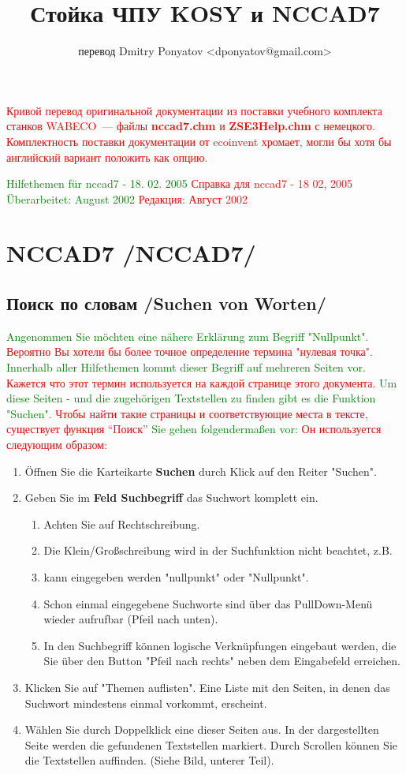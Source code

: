 \documentclass[12pt,a4paper]{book}
\title{Стойка ЧПУ KOSY и NCCAD7}
\author{перевод Dmitry Ponyatov <dponyatov@gmail.com>}
\newcommand{\DE}[1]{\textcolor{green}{#1}}
\newcommand{\RU}[1]{\textcolor{red}{#1}}
\newcommand{\TRpart}[2]{\part{#2 /#1/}}
\newcommand{\TRchapter}[2]{\chapter{#2 /#1/}}
\newcommand{\file}[1]{\textbf{#1}}
\begin{document}
\maketitle

\RU{Кривой перевод оригинальной документации из поставки учебного комплекта станков
WABECO~--- файлы \file{nccad7.chm} и \file{ZSE3Help.chm} с немецкого.
Комплектность поставки документации от ecoinvent хромает, могли бы хотя бы
английский вариант положить как опцию.}

\tableofcontents

\DE{Hilfethemen für nccad7 - 18. 02. 2005}
\RU{Справка для nccad7 - 18 02, 2005}
\DE{Überarbeitet: August 2002}
\RU{Редакция: Август 2002}

\TRpart{NCCAD7}{NCCAD7}

\TRchapter{Suchen von Worten}{Поиск по словам}

\bigskip 

\DE{Angenommen Sie möchten eine nähere Erklärung zum Begriff "Nullpunkt".}
\RU{Вероятно Вы хотели бы более точное определение термина
"нулевая точка".}
\DE{Innerhalb aller Hilfethemen kommt dieser Begriff auf mehreren Seiten vor.}
\RU{Кажется что этот термин используется на каждой странице этого
документа.}
\DE{Um diese Seiten - und die zugehörigen Textstellen zu finden gibt es die
Funktion "Suchen".}
\RU{Чтобы найти такие страницы и соответствующие места в тексте,
существует функция ``Поиск''}
\DE{Sie gehen folgendermaßen vor:}
\RU{Он используется следующим образом:}
\begin{enumerate}
  \item Öffnen Sie die Karteikarte \textbf{Suchen} durch Klick auf den Reiter
  "Suchen".
  \item Geben Sie im \textbf{Feld Suchbegriff} das Suchwort komplett ein. 
\begin{enumerate}
  \item Achten Sie auf Rechtschreibung. 
  \item Die Klein/Großschreibung wird in der Suchfunktion nicht beachtet, z.B.
  \item kann eingegeben werden "nullpunkt" oder "Nullpunkt".
  \item Schon einmal eingegebene Suchworte sind über das PullDown-Menü wieder
  aufrufbar (Pfeil nach unten).
  \item In den Suchbegriff können logische Verknüpfungen eingebaut werden, die
Sie über den Button "Pfeil nach rechts" neben dem Eingabefeld erreichen.
\end{enumerate}
  \item Klicken Sie auf "Themen auflisten". Eine Liste mit den Seiten, in denen
das Suchwort mindestens einmal vorkommt, erscheint.
  \item Wählen Sie durch Doppelklick eine dieser Seiten aus. In der
dargestellten Seite werden die gefundenen Textstellen markiert. Durch Scrollen können
 Sie die Textstellen auffinden. (Siehe Bild, unterer Teil).
\end{enumerate}
\end{document}
